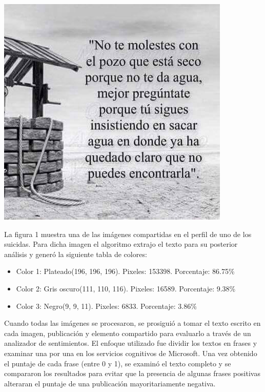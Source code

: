 \documentclass[12pt, man, donotrepeattitle, letterpaper]{apa6}
\begin{document}
    \begin{center}
        \begin{minipage}{0.6\linewidth}
            \includegraphics[width=\linewidth]{images/1}
        \end{minipage}
    \end{center}
    
    La figura 1 muestra una de las imágenes compartidas en el perfil de uno de los suicidas. Para dicha imagen el algoritmo extrajo el texto para su posterior análisis y generó la siguiente tabla de colores:
    \begin{itemize}
        \item Color 1: Plateado(196, 196, 196). Pixeles: 153398. Porcentaje: 86.75\%
        \item Color 2: Gris oscuro(111, 110, 116). Pixeles: 16589. Porcentaje: 9.38\%
        \item Color 3: Negro(9, 9, 11). Pixeles: 6833. Porcentaje: 3.86\%
    \end{itemize}

    Cuando todas las imágenes se procesaron, se prosiguió a tomar el texto escrito en cada imagen, publicación y elemento compartido para evaluarlo a través de un analizador de sentimientos. El enfoque utilizado fue dividir los textos en frases y examinar una por una en los servicios cognitivos de Microsoft. Una vez obtenido el puntaje de cada frase (entre 0 y 1), se examinó el texto completo y se compararon los resultados para evitar que la presencia de algunas frases positivas alteraran el puntaje de una publicación mayoritariamente negativa.
    \newpage
\end{document}
